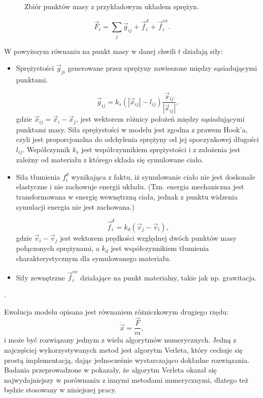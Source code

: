 \begin{figure}[ht]
\centering

\caption{Zbiór punktów masy z przykładowym układem sprężyn.}
\end{figure}

%
%
\begin{equation}
\vec{F}_{i} = \sum_{j} \vec{g}_{ij} + \vec{f}^{d}_i + \vec{f}^{ex}_{i}.
\end{equation}

W powyższym równaniu na punkt masy w danej chwili $t$ działają siły:
\begin{itemize}
\item  Sprężystości $\vec{g}_{ji}$ generowane przez sprężyny zawieszone między sąsiadującymi punktami.

\begin{equation}
\vec{g}_{ij} = k_s (|\vec{x}_{ij}| - l_{ij})\frac{\vec{x}_{ij}}{|\vec{x}_{ij}|},
\end{equation}
gdzie $\vec{x}_{ij} = \vec{x}_i - \vec{x}_j$, jest wektorem różnicy położeń między sąsiadującymi punktami masy. Siła sprężystości w modelu jest zgodna z prawem Hook'a, czyli jest proporcjonalna do odchylenia sprężyny od jej spoczynkowej długości $l_{ij}$. Współczynnik $k_s$ jest współczynnikiem sprężystości i z założenia jest zależny od materiału z którego składa się symulowane ciało.

\item Siła tłumienia $f^{d}_i$ wynikająca z faktu, iż symulowanie ciało nie jest doskonale elastyczne i nie zachowuje energii układu. (Tzn. energia mechaniczna jest transformowana w energię wewnętrzną ciała, jednak z punktu widzenia symulacji energia nie jest zachowana.)

\begin{equation}
\vec{f}^{d}_i = k_d(\vec{v}_j - \vec{v}_i),
\end{equation}
gdzie $\vec{v}_i - \vec{v}_j$ jest wektorem prędkości względnej dwóch punktów
masy połączonych sprężynami, a $k_d$ jest współczynnikiem tłumienia charakterystycznym dla symulowanego materiału.

\item Siły zewnętrzne $\vec{f}^{ex}_{i}$ działające na punkt materialny, takie jak np. grawitacja.
\end{itemize}. 

Ewolucja modelu opisana jest równaniem różniczkowym drugiego rzędu:
\begin{equation}
\ddot{\vec{x}} = \frac{\vec{F}}{m},
\end{equation}
i może być rozwiązany jednym z wielu algorytmów numerycznych.
Jedną z najczęściej wykorzystywanych metod jest algorytm Verleta, który cechuje się prostą
implementacją, dając jednocześnie wystarczająco dokładne rozwiązania. Badania
przeprowadzone w \cite{var} pokazały, że algorytm Verleta okazał się
najwydajniejszy w porównaniu z innymi metodami numerycznymi, dlatego też będzie
stosowany w niniejszej pracy.

